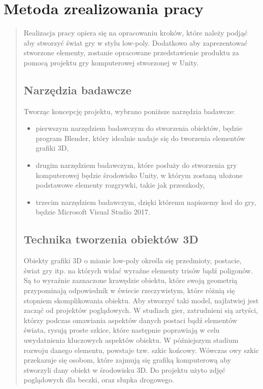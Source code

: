\newpage
\chapter{Metoda zrealizowania pracy}
\begin{quotation}
\indent Realizacja pracy opiera się na opracowaniu kroków, które należy podjąć aby stworzyć świat gry w stylu low-poly. Dodatkowo aby zaprezentować stworzone elementy, zostanie opracowane przedstawienie produktu za pomocą projektu gry komputerowej stworzonej w Unity.
\section{Narzędzia badawcze}
 Tworząc koncepcję projektu, wybrano poniższe narzędzia badawcze:
\begin{itemize}
\item pierwszym narzędziem badawczym do stworzenia obiektów, będzie program Blender, który idealnie nadaje się do tworzenia elementów grafiki 3D,

\item drugim narzędziem badawczym, które posłuży do stworzenia gry komputerowej będzie środowisko Unity, w którym zostaną ułożone podstawowe elementy rozgrywki, takie jak przeszkody,

\item trzecim narzędziem badawczym, dzięki któremu napiszemy kod do gry, będzie Microsoft Visual Studio 2017.

\end{itemize}

\section{Technika tworzenia obiektów 3D}
\indent Obiekty grafiki 3D o mianie low-poly określa się przedmioty, postacie, świat gry itp. na których widać wyraźne elementy trisów bądź poligonów. Są to wyraźnie zaznaczone krawędzie obiektu, które swoją geometrią przypominają odpowiednik w świecie rzeczywistym, które różnią się stopniem skomplikowania obiektu. Aby stworzyć taki model, najłatwiej jest zacząć od projektów poglądowych. W studiach gier, zatrudnieni sią artyści, którzy podczas omawiania aspektów danych postaci bądź elementów świata, rysują proste szkice, które następnie poprawiają w celu uwydatnienia kluczowych aspektów obiektu. 
W późniejszym stadium rozwoju danego elementu, powstaje tzw. szkic końcowy. Wówczas owy szkic przekazuje się osobom, które zajmują się grafiką komputerową aby stworzyli dany obiekt w środowisku 3D. Do projektu użyto zdjęć poglądowych dla beczki, oraz słupka drogowego.


\end{quotation}
